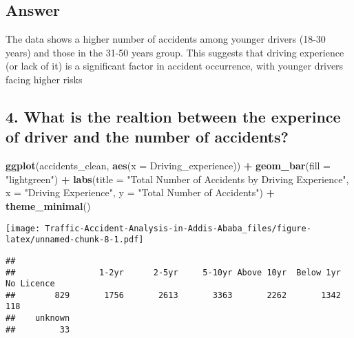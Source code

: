 \documentclass[
]{article}
\newenvironment{Shaded}{\begin{snugshade}}{\end{snugshade}}
\newcommand{\AttributeTok}[1]{\textcolor[rgb]{0.13,0.29,0.53}{#1}}
\newcommand{\CommentTok}[1]{\textcolor[rgb]{0.56,0.35,0.01}{\textit{#1}}}
\newcommand{\FunctionTok}[1]{\textcolor[rgb]{0.13,0.29,0.53}{\textbf{#1}}}
\newcommand{\NormalTok}[1]{#1}
\newcommand{\SpecialCharTok}[1]{\textcolor[rgb]{0.81,0.36,0.00}{\textbf{#1}}}
\newcommand{\StringTok}[1]{\textcolor[rgb]{0.31,0.60,0.02}{#1}}
\begin{document}
\hypertarget{answer-1}{%
\subsection{Answer}\label{answer-1}}

The data shows a higher number of accidents among younger drivers (18-30
years) and those in the 31-50 years group. This suggests that driving
experience (or lack of it) is a significant factor in accident
occurrence, with younger drivers facing higher risks

\hypertarget{what-is-the-realtion-between-the-experince-of-driver-and-the-number-of-accidents}{%
\subsection{4. What is the realtion between the experince of driver and
the number of
accidents?}\label{what-is-the-realtion-between-the-experince-of-driver-and-the-number-of-accidents}}

\begin{Shaded}
\begin{Highlighting}[]
\FunctionTok{ggplot}\NormalTok{(accidents\_clean, }\FunctionTok{aes}\NormalTok{(}\AttributeTok{x =}\NormalTok{ Driving\_experience)) }\SpecialCharTok{+}
  \FunctionTok{geom\_bar}\NormalTok{(}\AttributeTok{fill =} \StringTok{"lightgreen"}\NormalTok{) }\SpecialCharTok{+}
  \FunctionTok{labs}\NormalTok{(}\AttributeTok{title =} \StringTok{"Total Number of Accidents by Driving Experience"}\NormalTok{, }\AttributeTok{x =} \StringTok{"Driving Experience"}\NormalTok{, }\AttributeTok{y =} \StringTok{"Total Number of Accidents"}\NormalTok{) }\SpecialCharTok{+}
  \FunctionTok{theme\_minimal}\NormalTok{()}
\end{Highlighting}
\end{Shaded}

\texttt{[image: Traffic-Accident-Analysis-in-Addis-Ababa\_files/figure-latex/unnamed-chunk-8-1.pdf]}

\begin{Shaded}
\end{Shaded}

\begin{verbatim}
## 
##                 1-2yr      2-5yr     5-10yr Above 10yr  Below 1yr No Licence 
##        829       1756       2613       3363       2262       1342        118 
##    unknown 
##         33
\end{verbatim}
\end{document}
